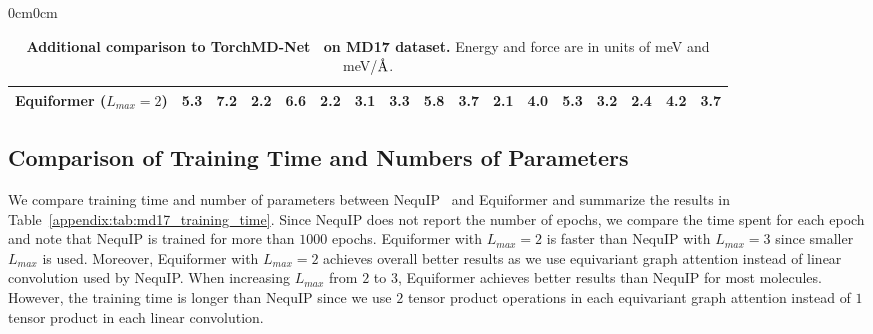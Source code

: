 \begin{table}[t]
\begin{adjustwidth}{0cm}{0cm}
{\begin{tabular}{lcccccccccccccccc}
\midrule[0.6pt]

Equiformer ($L_{max} = 2$)                                           & \textbf{5.3}          & \textbf{7.2}          & \textbf{2.2}          & \textbf{6.6}          & \textbf{2.2}          & \textbf{3.1}          & \textbf{3.3}             & \textbf{5.8}             & \textbf{3.7}            & \textbf{2.1}           & \textbf{4.0}              & \textbf{5.3}             & \textbf{3.2}         & \textbf{2.4}          & 4.2          & \textbf{3.7}        \\
\bottomrule[1.2pt]
\end{tabular}
}
\end{adjustwidth}
\vspace{-2mm}
\caption{\textbf{Additional comparison to TorchMD-Net~\citep{torchmd_net} on MD17 dataset.} Energy and force are in units of meV and meV/$\textup{\AA}$.}
\label{appendix:tab:md17_torchmdnet}
\end{table}


\subsection{Comparison of Training Time and Numbers of Parameters}
\label{appendix:subsec:md17_training_time_comparison}
We compare training time and number of parameters between NequIP~\citep{nequip} and Equiformer and summarize the results in Table~\ref{appendix:tab:md17_training_time}.
Since NequIP does not report the number of epochs, we compare the time spent for each epoch and note that NequIP is trained for more than $1000$ epochs.
Equiformer with $L_{max} = 2$ is faster than NequIP with $L_{max} = 3$ since smaller $L_{max}$ is used.
Moreover, Equiformer with $L_{max} = 2$ achieves overall better results as we use equivariant graph attention instead of linear convolution used by NequIP.
When increasing $L_{max}$ from $2$ to $3$, Equiformer achieves better results than NequIP for most molecules.
However, the training time is longer than NequIP since we use $2$ tensor product operations in each equivariant graph attention instead of $1$ tensor product in each linear convolution.


